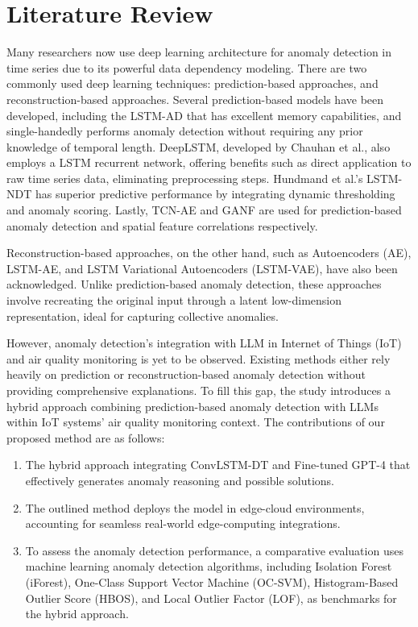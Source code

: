 \documentclass[final,3p,times,twocolumn]{elsarticle}
\begin{document}
\section{Literature Review}\label{sec2}
Many researchers now use deep learning architecture for anomaly detection in time series due to its powerful data dependency modeling. There are two commonly used deep learning techniques: prediction-based approaches, and reconstruction-based approaches. Several prediction-based models have been developed, including the LSTM-AD that has excellent memory capabilities, and single-handedly performs anomaly detection without requiring any prior knowledge of temporal length. DeepLSTM, developed by Chauhan et al., also employs a LSTM recurrent network, offering benefits such as direct application to raw time series data, eliminating preprocessing steps. Hundmand et al.'s LSTM-NDT has superior predictive performance by integrating dynamic thresholding and anomaly scoring. Lastly, TCN-AE and GANF are used for prediction-based anomaly detection and spatial feature correlations respectively. 

Reconstruction-based approaches, on the other hand, such as Autoencoders (AE), LSTM-AE, and LSTM Variational Autoencoders (LSTM-VAE), have also been acknowledged. Unlike prediction-based anomaly detection, these approaches involve recreating the original input through a latent low-dimension representation, ideal for capturing collective anomalies. 

However, anomaly detection's integration with LLM in Internet of Things (IoT) and air quality monitoring is yet to be observed. Existing methods either rely heavily on prediction or reconstruction-based anomaly detection without providing comprehensive explanations. To fill this gap, the study introduces a hybrid approach combining prediction-based anomaly detection with LLMs within IoT systems' air quality monitoring context. 
The contributions of our proposed method are as follows: 
\begin{enumerate}
\item The hybrid approach integrating ConvLSTM-DT and Fine-tuned GPT-4 that effectively generates anomaly reasoning and possible solutions. 
\item The outlined method deploys the model in edge-cloud environments, accounting for seamless real-world edge-computing integrations. 
\item To assess the anomaly detection performance, a comparative evaluation uses machine learning anomaly detection algorithms, including Isolation Forest (iForest), One-Class Support Vector Machine (OC-SVM), Histogram-Based Outlier Score (HBOS), and Local Outlier Factor (LOF), as benchmarks for the hybrid approach.
\end{enumerate}
\end{document}
